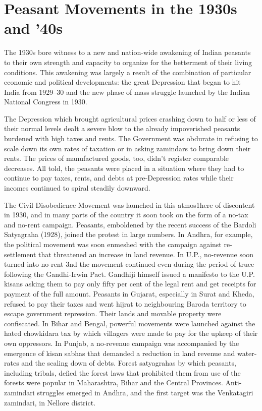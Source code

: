\chapter{Peasant Movements in the 1930s and '40s}
\begin{multicols}{2}

The 1930s bore witness to a new and nation-wide awakening of Indian peasants to their own strength and capacity to organize for the betterment of their living conditions. This awakening was largely a result of the combination of particular economic and political developments: the great Depression that began to hit India from 1929--30 and the new phase of mass struggle launched by the Indian National Congress in 1930.

The Depression which brought agricultural prices crashing down to half or less of their normal levels dealt a severe blow to the already impoverished peasants burdened with high taxes and rents. The Government was obdurate in refusing to scale down its own rates of taxation or in asking zamindars to bring down their rents. The prices of manufactured goods, too, didn't register comparable decreases. All told, the peasants were placed in a situation where they had to continue to pay taxes, rents, and debts at pre-Depression rates while their incomes continued to spiral steadily downward.

The Civil Disobedience Movement was launched in this atmos1here of discontent in 1930, and in many parts of the country it soon took on the form of a no-tax and no-rent campaign. Peasants, emboldened by the recent success of the Bardoli Satyagraha (1928), joined the protest in large numbers. In Andhra, for example, the political movement was soon enmeshed with the campaign against re-settlement that threatened an increase in land revenue. In U.P., no-revenue soon turned into no-rent 3nd the movement continued even during the period of truce following the Gandhi-Irwin Pact. Gandhiji himself issued a manifesto to the U.P. kisans asking them to pay only fifty per cent of the legal rent and get receipts for payment of the full amount. Peasants in Gujarat, especially in Surat and Kheda, refused to pay their taxes and went hijrat to neighbouring Baroda territory to escape government repression. Their lands and movable property were confiscated. In Bihar and Bengal, powerful movements were launched against the hated chowkidara tax by which villagers were made to pay for the upkeep of their own oppressors. In Punjab, a no-revenue campaign was accompanied by the emergence of kisan sabhas that demanded a reduction in land revenue and water-rates and the scaling down of debts. Forest satyagrahas by which peasants, including tribals, defied the forest laws that prohibited them from use of the forests were popular in Maharashtra, Bihar and the Central Provinces. Anti-zamindari struggles emerged in Andhra, and the first target was the Venkatagiri zamindari, in Nellore district.


\end{multicols}
